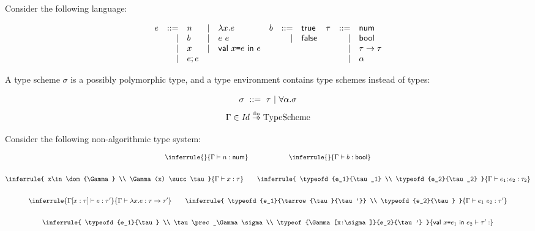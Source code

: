 \begin{exercise}

\item Consider the following language:

\vspace{-1em}

\[
\begin{array}{rrlrlrrlrrl}
  e &::=& n &|& \lambda x.e & b &::=& \textsf{true} & \tau &::=& \textsf{num} \\
  &|& b &|& e\ e & &|& \textsf{false} &&|& \textsf{bool} \\
  &|& x &|& \textsf{val}\ x\texttt{=} e\ \textsf{in}\ e &&&&&|& \tau\rightarrow\tau \\
  &|& e;e &&&&&&&|& \alpha \\
\end{array}
\]

A type scheme $\sigma$ is a possibly polymorphic type,
and a type environment contains type schemes instead of types:

\vspace{-1em}

\[ \sigma\ ::=\ \tau\ |\ \tforall{\alpha}{\sigma} \]
\[ \Gamma \in \embox{Id}\finto\text{TypeScheme} \]

Consider the following non-algorithmic type system:

\vspace{-1em}

\[
\begin{array}{@{}c@{}}
  \inferrule
  {}
  { \typeofd{n}{\tnum} }
  \qquad
  \qquad
  \qquad
  \inferrule
  {}
  { \typeofd{b}{\tbool} }
  \\[2em]
  \inferrule
  {
    x\in\dom{\Gamma} \\
    \Gamma(x) \succ \tau
  }
  { \typeofd{x}{\tau} }
  \qquad
  \inferrule
  {
    \typeofd{e_1}{\tau_1} \\
    \typeofd{e_2}{\tau_2}
  }
  { \typeofd{\eseq{e_1}{e_2}}{\tau_2} }
  \\[2em]
  \inferrule
  { \typeof{\Gamma[x:\tau]}{e}{\tau'} }
  { \typeofd{\efun{x}{e}}{\tarrow{\tau}{\tau'}} }
  \qquad
  \inferrule
  {
    \typeofd{e_1}{\tarrow{\tau}{\tau'}} \\
    \typeofd{e_2}{\tau}
  }
  { \typeofd{\eapp{e_1}{e_2}}{\tau'} }
  \\[2em]
  \inferrule
  {
    \typeofd{e_1}{\tau} \\
    \tau\prec_\Gamma\sigma \\
    \typeof{\Gamma[x:\sigma]}{e_2}{\tau'}
  }
  { \typeof{\ebind{x}{e_1}{e_2}}{\tau'} }
\end{array}
\]


\end{exercise}
